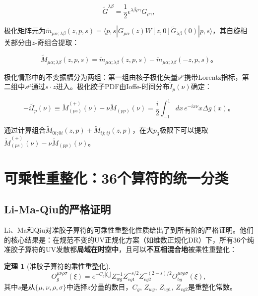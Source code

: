 \documentclass[12pt,a4paper]{ctexart}
\theoremstyle{definition}
\newtheorem{theorem}{定理}[section]
\begin{document}
\begin{equation}
\tilde{G}^{\lambda\beta} = \frac{1}{2}\epsilon^{\lambda\beta\rho\gamma} G_{\rho\gamma},
\label{eq:dual_G}
\end{equation}

极化矩阵元为$\tilde{m}_{\mu\alpha;\lambda\beta}(z,p,s) = \langle p,s| G_{\mu\alpha}(z) W[z,0] \tilde{G}_{\lambda\beta}(0) |p,s\rangle$，其自旋相关部分由$z$-奇组合提取\cite{Egerer2022}：

\begin{equation}
\tilde{M}_{\mu\alpha;\lambda\beta}(z,p,s) = \tilde{m}_{\mu\alpha;\lambda\beta}(z,p,s) - \tilde{m}_{\mu\alpha;\lambda\beta}(-z,p,s)。
\label{eq:z_odd_pol}
\end{equation}

极化情形中的不变振幅分为两组：第一组由核子极化矢量$s^\mu$携带Lorentz指标，第二组中$s^\mu$通过$s \cdot z$进入。极化胶子PDF由Ioffe-时间分布$\tilde{I}_p(\nu)$确定\cite{Egerer2022}：

\begin{equation}
-i\tilde{I}_p(\nu) \equiv \tilde{M}_{(ps)}^{(+)}(\nu) - \nu \tilde{M}_{(pp)}(\nu) = \frac{i}{2} \int_{-1}^{1} dx\, e^{-ix\nu} x \Delta g(x)。
\label{eq:Ioffe_pol}
\end{equation}

通过计算组合$\tilde{M}_{0i;0i}(z,p) + \tilde{M}_{ij;ij}(z,p)$，在大$p_3$极限下可以提取$\tilde{M}_{(ps)}^{(+)}(\nu) - \nu \tilde{M}_{(pp)}(\nu)$。

\section{可乘性重整化：36个算符的统一分类}

\subsection{Li-Ma-Qiu的严格证明}

Li、Ma和Qiu\cite{Li2018multiplicative}对准胶子算符的可乘性重整化性质给出了到所有阶的严格证明。他们的核心结果是：在规范不变的UV正规化方案（如维数正规化DR）下，所有36个纯准胶子算符的UV发散都\textbf{局域在时空中}，且可以\textbf{不互相混合地}被乘性重整化\cite{Li2018multiplicative}：

\begin{theorem}[准胶子算符的乘性重整化]\cite{Li2018multiplicative}
\begin{equation}
O^{\mu\nu\rho\sigma}_g(\xi) = e^{-C_g|\xi_z|} Z^{-1}_{wg} Z^{-s/2}_{vg1} Z^{-(2-s)/2}_{vg2} O^{\mu\nu\rho\sigma}_{bg}(\xi),
\label{eq:multiplicative_renorm}
\end{equation}
其中$s$是从$\{\mu,\nu,\rho,\sigma\}$中选择$z$分量的数目，$C_g$, $Z_{wg}$, $Z_{vg1}$, $Z_{vg2}$是重整化常数。
\end{theorem}
\end{document}
